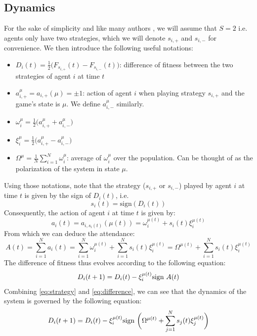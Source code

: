 \documentclass[a4paper, amsfonts, amssymb, amsmath, reprint, showkeys, nofootinbib, twoside]{revtex4-1}
\begin{document}
\subsection{Dynamics}
For the sake of simplicity and like many authors \cite{Challet_1997}, we will assume that $S=2$ i.e. agents only have two strategies, which we will denote $s_{i,+}$ and $s_{i,-}$ for convenience. We then introduce the following useful notations:
\begin{itemize}
    \item $D_i(t) = \frac{1}{2}\big(F_{s_{i,+}}(t) - F_{s_{i,-}}(t)\big)$: difference of fitness between the two strategies of agent $i$ at time $t$
    \item $a_{i,+}^\mu = a_{i,+}(\mu) = \pm 1$: action of agent $i$ when playing strategy $s_{i,+}$ and the game's state is $\mu$. We define $a_{i,-}^\mu$ similarly.
    \item $\omega_i^\mu = \frac{1}{2}\big(a_{i,+}^\mu + a_{i,-}^\mu\big)$
    \item $\xi_i^\mu = \frac{1}{2}\big(a_{i,+}^\mu - a_{i,-}^\mu\big)$
    \item $\Omega^\mu = \frac{1}{N} \sum_{i=1}^N \omega_i^\mu$: average of $\omega_i^\mu$ over the population. Can be thought of as the polarization of the system in state $\mu$.
\end{itemize}

Using those notations, note that the strategy ($s_{i,+}$ or $s_{i,-}$) played by agent $i$ at time $t$ is given by the sign of $D_i(t)$, i.e.
\begin{equation}
\label{eq:strategy}
    s_i(t) = \text{sign}(D_i(t))
\end{equation}
Consequently, the action of agent $i$ at time $t$ is given by:
\begin{equation}
    a_i(t) = a_{i,s_i(t)}(\mu(t)) = \omega_i^{\mu(t)} + s_i(t) \xi_i^{\mu(t)}
\end{equation}
From which we can deduce the attendance:
\begin{equation}
    A(t) = \sum_{i=1}^N a_i(t) = \sum_{i=1}^N \omega_i^{\mu(t)} + \sum_{i=1}^N s_i(t) \xi_i^{\mu(t)} = \Omega^{\mu(t)} + \sum_{i=1}^N s_i(t) \xi_i^{\mu(t)}
\end{equation}
The difference of fitness thus evolves according to the following equation:
\begin{equation}
\label{eq:difference}
    D_i(t+1) = D_i(t) - \xi_i^{\mu(t)} \textnormal{sign }A(t)
\end{equation}
Combining \eqref{eq:strategy} and \eqref{eq:difference}, we can see that the dynamics of the system is governed by the following equation:
\begin{equation}
\label{eq:dynamics}
    D_i(t+1) = D_i(t) - \xi_i^{\mu(t)} \textnormal{sign }\bigg(\Omega^{\mu(t)} + \sum_{j=1}^N s_j(t) \xi_j^{\mu(t)}\bigg)
\end{equation}
\end{document}
